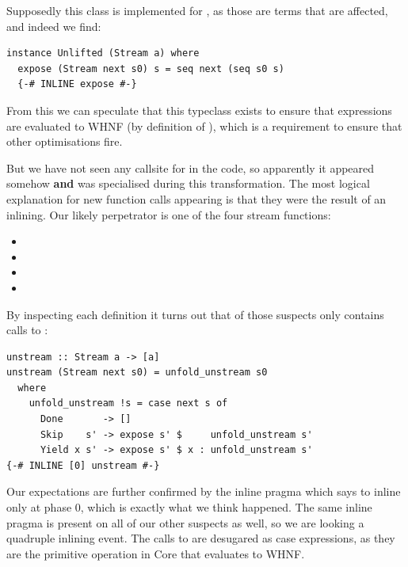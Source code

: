 Supposedly this class is implemented for , as those are terms that are affected, and indeed we find:

\begin{listing}[H]
\begin{verbatim}
instance Unlifted (Stream a) where
  expose (Stream next s0) s = seq next (seq s0 s)
  {-# INLINE expose #-}
\end{verbatim}
\end{listing}

From this we can speculate that this typeclass exists to ensure that expressions are evaluated to WHNF (by definition of ),
which is a requirement to ensure that other optimisations fire.

But we have not seen any callsite for  in the code, so apparently it appeared somehow \textbf{and} was specialised 
during this transformation. The most logical explanation for new function calls appearing is that they were the result of an inlining.
Our likely perpetrator is one of the four stream functions:

\begin{itemize}
\item {}
\item {}
\item {}
\item {}
\end{itemize}

By inspecting each definition it turns out that of those suspects only  contains calls to :

\begin{listing}[H]
\begin{verbatim}
unstream :: Stream a -> [a]
unstream (Stream next s0) = unfold_unstream s0
  where
    unfold_unstream !s = case next s of
      Done       -> []
      Skip    s' -> expose s' $     unfold_unstream s'
      Yield x s' -> expose s' $ x : unfold_unstream s'
{-# INLINE [0] unstream #-}
\end{verbatim}
\end{listing}

Our expectations are further confirmed by the inline pragma which says to inline only at phase 0, which is exactly what we think happened.
The same inline pragma is present on all of our other suspects as well, so we are looking a quadruple inlining event. The calls to 
are desugared as case expressions, as they are the primitive operation in Core that evaluates to WHNF.

